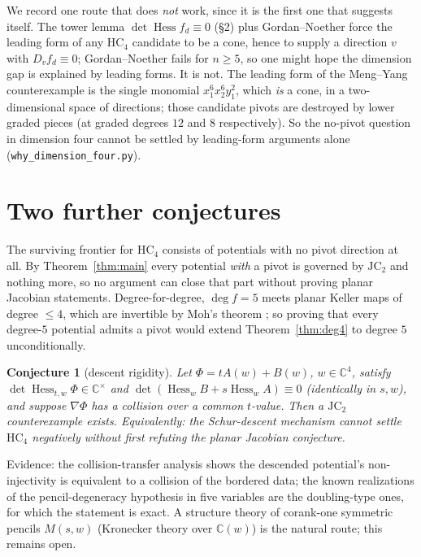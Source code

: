 \documentclass[11pt]{article}
\theoremstyle{plain}
\newtheorem{conjecture}[theorem]{Conjecture}
\theoremstyle{definition}
\newcommand{\C}{\mathbb{C}}
\newcommand{\Hess}{\operatorname{Hess}}
\newcommand{\HC}{\mathrm{HC}}
\newcommand{\JC}{\mathrm{JC}}
\begin{document}
We record one route that does \emph{not} work, since it is the first one
that suggests itself. The tower lemma $\det\Hess f_d\equiv0$ (\S2) plus
Gordan--Noether force the
leading form of any $\HC_4$ candidate to be a cone, hence to supply a
direction $v$ with $D_vf_d\equiv0$; Gordan--Noether fails for $n\ge5$, so
one might hope the dimension gap is explained by leading forms. It is not.
The leading form of the Meng--Yang counterexample is the single monomial
$x_1^6x_2^6y_1^2$, which \emph{is} a cone, in a two-dimensional space of
directions; those candidate pivots are destroyed by lower graded pieces
(at graded degrees $12$ and $8$ respectively). So the no-pivot question in
dimension four cannot be settled by leading-form arguments alone
(\texttt{why\_dimension\_four.py}).

\section{Two further conjectures}

The surviving frontier for $\HC_4$ consists of potentials with no pivot
direction at all. By Theorem~\ref{thm:main} every potential \emph{with} a
pivot is governed by $\JC_2$ and nothing more, so no argument can close
that part without proving planar Jacobian statements.
Degree-for-degree, $\deg f=5$ meets planar Keller maps of degree $\le4$,
which are invertible by Moh's theorem \cite{Moh}; so proving that every
degree-$5$ potential admits a pivot would extend
Theorem~\ref{thm:deg4} to degree $5$ unconditionally.

\begin{conjecture}[descent rigidity]\label{conj:c2}
Let $\Phi=tA(w)+B(w)$, $w\in\C^4$, satisfy $\det\Hess_{t,w}\Phi\in
\C^\times$ and $\det(\Hess_wB+s\Hess_wA)\equiv0$ (identically in $s,w$),
and suppose $\nabla\Phi$ has a collision over a common $t$-value. Then a
$\JC_2$ counterexample exists. Equivalently: the Schur-descent mechanism
cannot settle $\HC_4$ negatively without first refuting the planar
Jacobian conjecture.
\end{conjecture}

Evidence: the collision-transfer analysis shows the descended potential's
non-injectivity is equivalent to a collision of the bordered data; the
known realizations of the pencil-degeneracy hypothesis in five variables
are the doubling-type ones, for which the statement is exact. A structure
theory of corank-one symmetric pencils $M(s,w)$ (Kronecker theory over
$\C(w)$) is the natural route; this remains open.
\end{document}
